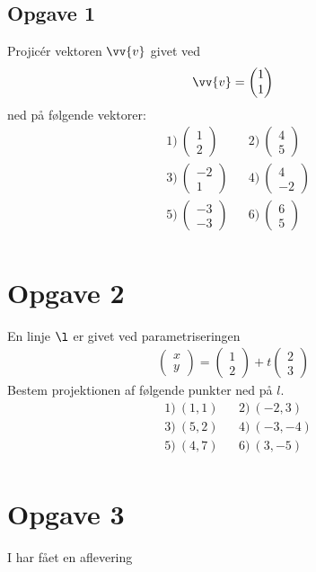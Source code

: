 \begin{exa}
\section*{Opgave 1}
Projicér vektoren $\vv{v}$ givet ved
\begin{align*}
\vv{v} = \begin{pmatrix}1 \\ 1
\end{pmatrix}
\end{align*}
ned på følgende vektorer:
\begin{align*}
&1) \ \begin{pmatrix}
1 \\ 2
\end{pmatrix}  &&2) \   \begin{pmatrix}
4 \\ 5
\end{pmatrix}  \\
&3) \ \begin{pmatrix}
-2 \\ 1
\end{pmatrix}  &&4) \ \begin{pmatrix}
4 \\ -2
\end{pmatrix}    \\
&5) \ \begin{pmatrix}
-3 \\ -3
\end{pmatrix}  &&6) \  \begin{pmatrix}
6 \\ 5
\end{pmatrix}   \\
\end{align*}
\end{exa}

\section*{Opgave 2}
En linje $\l$ er givet ved parametriseringen
\begin{align*}
\begin{pmatrix}
x \\ y 
\end{pmatrix} = \begin{pmatrix}
1 \\ 2
\end{pmatrix} + 
t\begin{pmatrix}
2 \\ 3
\end{pmatrix}
\end{align*}
Bestem projektionen af følgende punkter ned på $l$. 
\begin{align*}
&1) \ (1,1)  &&2) \  (-2,3)   \\
&3) \ (5,2)  &&4) \  (-3,-4)   \\
&5) \ (4,7)  &&6) \  (3,-5)   \\
\end{align*}

\section*{Opgave 3}
I har fået en aflevering
